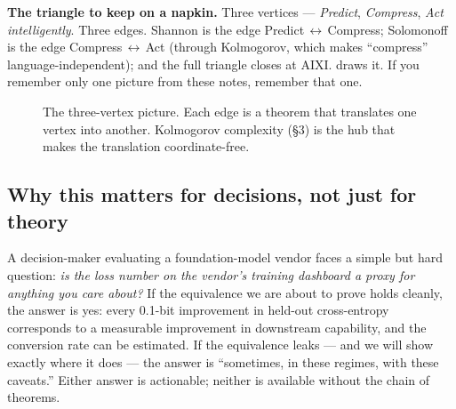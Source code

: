 \begin{intuition}
\textbf{The triangle to keep on a napkin.} Three vertices ---
\emph{Predict}, \emph{Compress}, \emph{Act intelligently}. Three
edges. Shannon is the edge Predict\,$\leftrightarrow$\,Compress;
Solomonoff is the edge Compress\,$\leftrightarrow$\,Act (through
Kolmogorov, which makes ``compress'' language-independent); and the
full triangle closes at AIXI.  draws it. If you
remember only one picture from these notes, remember that one.
\end{intuition}

\begin{figure}[h]
\centering
{}
\caption{The three-vertex picture. Each edge is a theorem that
translates one vertex into another. Kolmogorov complexity
(\S3) is the hub that makes the translation coordinate-free.}
\label{fig:triangle}
\end{figure}

\subsection*{Why this matters for decisions, not just for theory}

A decision-maker evaluating a foundation-model vendor faces a
simple but hard question: \emph{is the loss number on the vendor's
training dashboard a proxy for anything you care about?} If the
equivalence we are about to prove holds cleanly, the answer is yes:
every 0.1-bit improvement in held-out cross-entropy corresponds to
a measurable improvement in downstream capability, and the
conversion rate can be estimated. If the equivalence leaks --- and
we will show exactly where it does --- the answer is ``sometimes,
in these regimes, with these caveats.'' Either answer is
actionable; neither is available without the chain of theorems.

